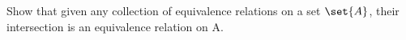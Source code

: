 \documentclass[main.tex]{subfiles}
\begin{document}
\subproblem{}\label{s03p05b}

Show that given any collection of equivalence relations on a set \(\set{A}\),
their intersection is an equivalence relation on A.

\todo{}
\end{document}
